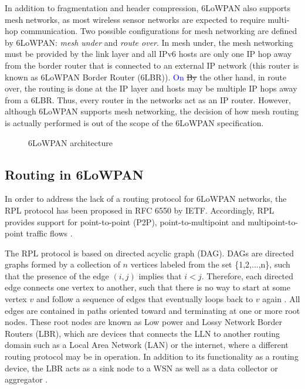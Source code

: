 \documentclass[authoryear,preprint,review,12pt]{elsarticle}
\newcommand{\rev}{\textcolor{blue}}
\begin{document}
In addition to fragmentation and header compression, 6LoWPAN also supports mesh networks, as most wireless sensor networks are expected to require multi-hop communication. Two possible configurations for mesh networking are defined by 6LoWPAN: \textit{mesh under} and \textit{route over}. In mesh under, the mesh networking must be provided by the link layer and all IPv6 hosts are only one IP hop away from the border router that is connected to an external IP network (this router is known as 6LoWPAN Border Router (6LBR)). \rev{On} \sout{By} the other hand, in route over, the routing is done at the IP layer and hosts may be multiple IP hops away from a 6LBR. Thus, every router in the networks act as an IP router. However, although 6LoWPAN supports mesh networking, the decision of how mesh routing is actually performed is out of the scope of the 6LoWPAN specification.

\begin{figure}
\centering
{}
\caption{6LoWPAN architecture}
\label{stack_6lowpan}
\end{figure}

\subsection{Routing in 6LoWPAN}
In order to address the lack of a routing protocol for 6LoWPAN networks, the RPL protocol has been proposed in RFC 6550 by IETF. Accordingly, RPL provides support for point-to-point (P2P), point-to-multipoint and multipoint-to-point traffic flows \citep{RFC6550}.

The RPL protocol is based on directed acyclic graph (DAG). DAGs are directed graphs formed by a collection of $n$ vertices labeled from the set \{1,2,...,n\}, such that the presence of the edge $(i,j)$ implies that $i < j$. Therefore, each directed edge connects one vertex to another, such that there is no way to start at some vertex $v$ and follow a sequence of edges that eventually loops back to $v$ again \citep{DAGS_1992}. All edges are contained in paths oriented toward and terminating at one or more root nodes. These root nodes are known as Low power and Lossy Network Border Routers (LBR), which are devices that connects the LLN to another routing domain such as a Local Area Network (LAN) or the internet, where a different routing protocol may be in operation. In addition to its functionality as a routing device, the LBR acts as a sink node to a WSN as well as a data collector or aggregator \citep{RFC7102}.
\end{document}
